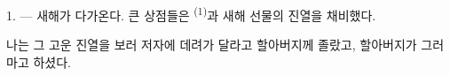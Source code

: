 %
%
%
%
%

\VUsaut{4.0mm}
\VUsaut{2.0mm}
\VUsaut{3.4mm}

1. --- 새해가 다가온다. 큰 상점들은  \textsuperscript{(1)}과 새해 선물의
진열을 채비했다.

나는 그 고운 진열을 보러 저자에 데려가 달라고 할아버지께 졸랐고, 할아버지가 그러마고
하셨다.

